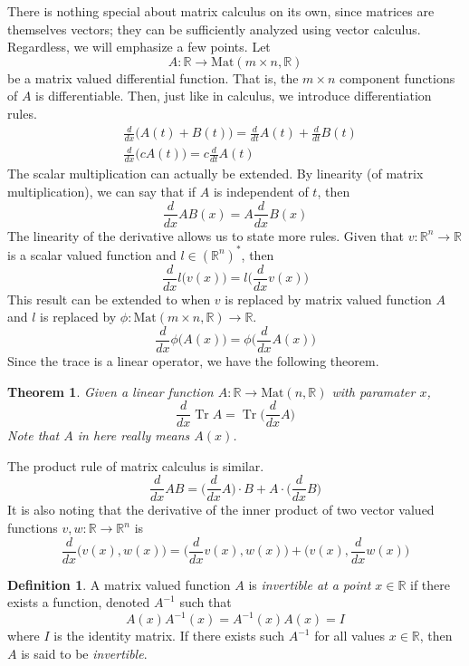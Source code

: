 \documentclass{article}
\DeclareMathOperator{\Tr}{Tr}
\newtheorem{theorem}{Theorem}[section]
\theoremstyle{remark}
\theoremstyle{definition}
\newtheorem{definition}{Definition}[section]
\begin{document}
    There is nothing special about matrix calculus on its own, since matrices are themselves vectors; they can be sufficiently analyzed using vector calculus. Regardless, we will emphasize a few points. Let
    \[A: \mathbb{R} \longrightarrow \text{Mat}(m \times n, \mathbb{R})\]
    be a matrix valued differential function. That is, the $m \times n$ component functions of $A$ is differentiable. Then, just like in calculus, we introduce differentiation rules.
    \begin{align*}
        & \frac{d}{d x} \big( A(t) + B(t)\big) = \frac{d}{d t} A(t) + \frac{d}{d t} B(t) \\
        & \frac{d}{d x} \big( c A(t)\big) = c \frac{d}{d t} A(t)
    \end{align*}
    The scalar multiplication can actually be extended. By linearity (of matrix multiplication), we can say that if $A$ is independent of $t$, then 
    \[\frac{d}{d x} A B (x) = A \frac{d}{d x} B(x)\]
    The linearity of the derivative allows us to state more rules. Given that $v: \mathbb{R}^n \longrightarrow \mathbb{R}$ is a scalar valued function and $l \in (\mathbb{R}^n)^*$, then  
    \[\frac{d}{d x} l \big( v(x) \big) = l \bigg( \frac{d}{d x} v(x) \bigg)\]
    This result can be extended to when $v$ is replaced by matrix valued function $A$ and $l$ is replaced by $\phi: \text{Mat}(m \times n, \mathbb{R}) \longrightarrow \mathbb{R}$. 
    \[\frac{d}{d x} \phi \big( A(x) \big) = \phi \bigg( \frac{d}{d x} A(x) \bigg)\]
    Since the trace is a linear operator, we have the following theorem. 

    \begin{theorem}
    Given a linear function $A: \mathbb{R} \longrightarrow \text{Mat}(n, \mathbb{R})$ with paramater $x$, 
    \[\frac{d}{d x} \Tr{A} = \Tr \bigg( \frac{d}{d x} A \bigg)\]
    Note that $A$ in here really means $A(x)$.
    \end{theorem}

    The product rule of matrix calculus is similar.
    \[\frac{d}{d x} A B = \bigg(\frac{d}{d x} A\bigg) \cdot B + A \cdot \bigg(\frac{d}{d x} B \bigg)\]
    It is also noting that the derivative of the inner product of two vector valued functions $v, w: \mathbb{R} \longrightarrow \mathbb{R}^n$ is 
    \[\frac{d}{d x} \big( v(x), w(x) \big) = \Big( \frac{d}{d x} v(x), w(x) \Big) + \Big( v(x), \frac{d}{d x} w(x) \Big)\]

    \begin{definition}
    A matrix valued function $A$ is \textit{invertible at a point $x \in \mathbb{R}$} if there exists a function, denoted $A^{-1}$ such that
    \[A(x) A^{-1} (x) = A^{-1}(x) A(x) = I\]
    where $I$ is the identity matrix. If there exists such $A^{-1}$ for all values $x \in \mathbb{R}$, then $A$ is said to be \textit{invertible}. 
    \end{definition}
\end{document}
